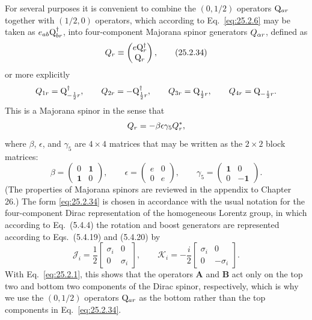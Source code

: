 For several purposes it is convenient to combine the \((0,1/2)\) operators
\(\mathrm{Q}_{ar}\) together with \((1/2,0)\) operators, which according to
Eq.~\eqref{eq:25.2.6} may be taken as
\(e_{ab}\mathrm{Q}_{br}^\dagger\), into
four-component Majorana spinor generators \(Q_{\alpha r}\),
defined as
\begin{equation}
Q_r\equiv
\begin{pmatrix}
e\mathrm{Q}_r^\dagger\\
\mathrm{Q}_r
\end{pmatrix},
\tag{25.2.34}\label{eq:25.2.34}
\end{equation}
or more explicitly
\[
Q_{1r}=\mathrm{Q}_{-\frac12 r}^\dagger,
\qquad
Q_{2r}=-\mathrm{Q}_{\frac12 r}^\dagger,
\qquad
Q_{3r}=\mathrm{Q}_{\frac12 r},
\qquad
Q_{4r}=\mathrm{Q}_{-\frac12 r}.
\]
This is a Majorana spinor in the sense that
\[
Q_r=-\beta\epsilon\gamma_5Q_r^*,
\]
where \(\beta\), \(\epsilon\), and \(\gamma_5\) are \(4\times4\) matrices
that may be written as the \(2\times2\) block matrices:
\[
\beta=
\begin{pmatrix}
0&\mathbf{1}\\
\mathbf{1}&0
\end{pmatrix},
\qquad
\epsilon=
\begin{pmatrix}
e&0\\
0&e
\end{pmatrix},
\qquad
\gamma_5=
\begin{pmatrix}
\mathbf{1}&0\\
0&-\mathbf{1}
\end{pmatrix}.
\]
(The properties of Majorana spinors are reviewed in the appendix to
Chapter 26.) The form \eqref{eq:25.2.34} is chosen in accordance with the
usual notation for the four-component Dirac representation of the
homogeneous Lorentz group, in which according to Eq.~(5.4.4) the rotation
and boost generators are represented according to Eqs.~(5.4.19) and
(5.4.20) by
\begin{equation}
\mathcal J_i
=\frac12
\begin{bmatrix}
\sigma_i&0\\
0&\sigma_i
\end{bmatrix},
\qquad
\mathcal K_i
=-\frac i2
\begin{bmatrix}
\sigma_i&0\\
0&-\sigma_i
\end{bmatrix}.
\tag{25.2.35}\label{eq:25.2.35}
\end{equation}
With Eq.~\eqref{eq:25.2.1}, this shows that the operators \(\mathbf A\)
and \(\mathbf B\) act only on the top two and bottom two components of
the Dirac spinor, respectively, which is why we use the \((0,1/2)\)
operators \(\mathrm{Q}_{ar}\) as the bottom rather than the top components in
Eq.~\eqref{eq:25.2.34}.

